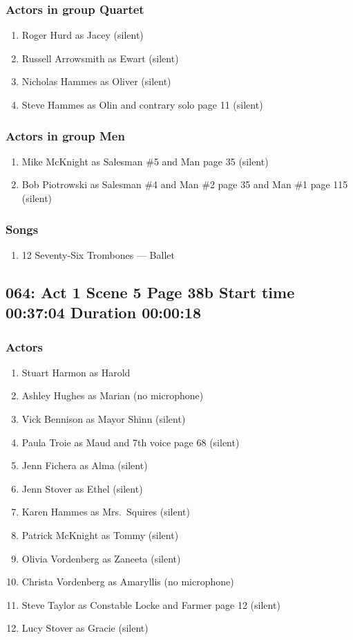 \subsubsection{Actors in group Quartet}
\begin{enumerate}
\item Roger Hurd as Jacey (silent)
\item Russell Arrowsmith as Ewart (silent)
\item Nicholas Hammes as Oliver (silent)
\item Steve Hammes as Olin and contrary solo page 11 (silent)
\end{enumerate}
\subsubsection{Actors in group Men}
\begin{enumerate}
\item Mike McKnight as Salesman \#5 and Man page 35 (silent)
\item Bob Piotrowski as Salesman \#4 and Man \#2 page 35 and Man \#1 page 115 (silent)
\end{enumerate}

\subsubsection{Songs}
\begin{enumerate}
\item 12 Seventy-Six Trombones --- Ballet
\end{enumerate}
\subsection{064: Act 1 Scene 5 Page 38b Start time 00:37:04 Duration 00:00:18}

\subsubsection{Actors}
\begin{enumerate}
\item Stuart Harmon as Harold
\item Ashley Hughes as Marian (no microphone)
\item Vick Bennison as Mayor Shinn (silent)
\item Paula Troie as Maud and 7th voice page 68 (silent)
\item Jenn Fichera as Alma (silent)
\item Jenn Stover as Ethel (silent)
\item Karen Hammes as Mrs.~Squires (silent)
\item Patrick McKnight as Tommy (silent)
\item Olivia Vordenberg as Zaneeta (silent)
\item Christa Vordenberg as Amaryllis (no microphone)
\item Steve Taylor as Constable Locke and Farmer page 12 (silent)
\item Lucy Stover as Gracie (silent)
\end{enumerate}

